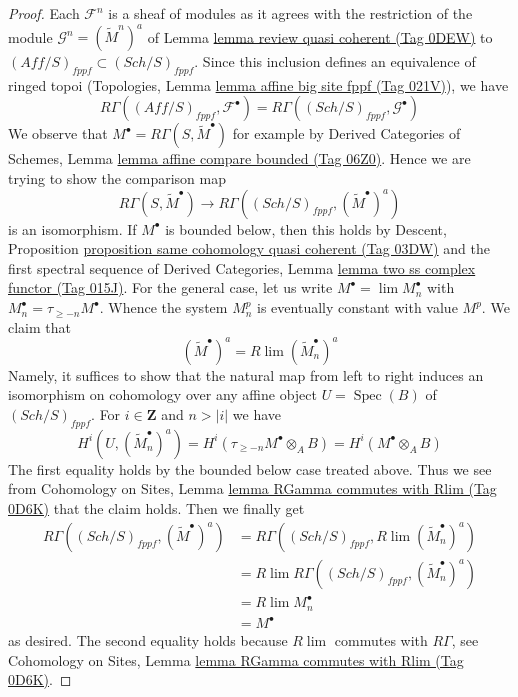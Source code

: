 \documentclass{amsart}
\theoremstyle{plain}
\theoremstyle{definition}
\theoremstyle{remark}
\numberwithin{equation}{subsection}
\def\lim{\mathop{\mathrm{lim}}\nolimits}
\def\Spec{\mathop{\mathrm{Spec}}}
\def\Sch{\mathit{Sch}}
\begin{document}
\begin{proof}
Each $\mathcal{F}^n$ is a sheaf of modules as it agrees with the
restriction of the module $\mathcal{G}^n = (\widetilde{M}^n)^a$ of
Lemma \href{https://stacks.math.columbia.edu/tag/0DEW}{lemma review quasi coherent (Tag 0DEW)} to
$(\textit{Aff}/S)_{fppf} \subset (\Sch/S)_{fppf}$.
Since this inclusion defines an equivalence of ringed topoi
(Topologies, Lemma \href{https://stacks.math.columbia.edu/tag/021V}{lemma affine big site fppf (Tag 021V)}),
we have
$$
R\Gamma((\textit{Aff}/S)_{fppf}, \mathcal{F}^\bullet) =
R\Gamma((\Sch/S)_{fppf}, \mathcal{G}^\bullet)
$$
We observe that $M^\bullet = R\Gamma(S, \widetilde{M}^\bullet)$
for example by Derived Categories of Schemes, Lemma
\href{https://stacks.math.columbia.edu/tag/06Z0}{lemma affine compare bounded (Tag 06Z0)}. Hence we are trying
to show the comparison map
$$
R\Gamma(S, \widetilde{M}^\bullet)
\longrightarrow
R\Gamma((\Sch/S)_{fppf}, (\widetilde{M}^\bullet)^a)
$$
is an isomorphism. If $M^\bullet$ is bounded below, then this
holds by Descent, Proposition
\href{https://stacks.math.columbia.edu/tag/03DW}{proposition same cohomology quasi coherent (Tag 03DW)}
and the first spectral sequence of Derived Categories, Lemma
\href{https://stacks.math.columbia.edu/tag/015J}{lemma two ss complex functor (Tag 015J)}.
For the general case, let us write $M^\bullet = \lim M_n^\bullet$
with $M_n^\bullet = \tau_{\geq -n}M^\bullet$. Whence the system
$M_n^p$ is eventually constant with value $M^p$. We claim that
$$
(\widetilde{M}^\bullet)^a = R\lim (\widetilde{M}_n^\bullet)^a
$$
Namely, it suffices to show that the natural map from left to right
induces an isomorphism on cohomology over any affine object
$U = \Spec(B)$ of $(\Sch/S)_{fppf}$. For $i \in \mathbf{Z}$ and
$n > |i|$ we have
$$
H^i(U, (\widetilde{M}_n^\bullet)^a) =
H^i(\tau_{\geq -n}M^\bullet \otimes_A B) =
H^i(M^\bullet \otimes_A B)
$$
The first equality holds by the bounded below case treated above.
Thus we see from Cohomology on Sites, Lemma
\href{https://stacks.math.columbia.edu/tag/0D6K}{lemma RGamma commutes with Rlim (Tag 0D6K)}
that the claim holds. Then we finally get
\begin{align*}
R\Gamma((\Sch/S)_{fppf}, (\widetilde{M}^\bullet)^a)
& =
R\Gamma((\Sch/S)_{fppf}, R\lim (\widetilde{M}_n^\bullet)^a) \\
& =
R\lim R\Gamma((\Sch/S)_{fppf}, (\widetilde{M}_n^\bullet)^a) \\
& =
R\lim M_n^\bullet \\
& =
M^\bullet
\end{align*}
as desired. The second equality holds because $R\lim$ commutes with
$R\Gamma$, see Cohomology on Sites, Lemma
\href{https://stacks.math.columbia.edu/tag/0D6K}{lemma RGamma commutes with Rlim (Tag 0D6K)}.
\end{proof}
\end{document}
